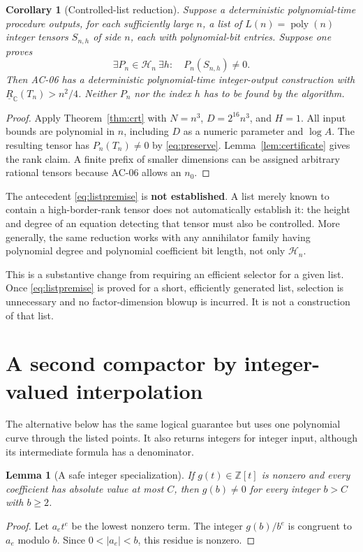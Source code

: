 \documentclass[11pt]{article}
\newtheorem{lemma}[theorem]{Lemma}
\newtheorem{corollary}[theorem]{Corollary}
\theoremstyle{definition}
\theoremstyle{remark}
\newcommand{\C}{\mathbb C}
\newcommand{\Z}{\mathbb Z}
\newcommand{\BR}{\underline R_{\C}}
\newcommand{\poly}{\operatorname{poly}}
\newcommand{\Witness}{\mathcal H}
\begin{document}
\begin{corollary}[Controlled-list reduction]\label{cor:list}
Suppose a deterministic polynomial-time procedure outputs, for each sufficiently large $n$, a list of $L(n)=\poly(n)$ integer tensors $S_{n,h}$ of side $n$, each with polynomial-bit entries. Suppose one proves
\begin{equation}\label{eq:listpremise}
 \exists P_n\in\Witness_n\ \exists h:\quad P_n(S_{n,h})\ne0.
\end{equation}
Then AC-06 has a deterministic polynomial-time integer-output construction with $\BR(T_n)>n^2/4$. Neither $P_n$ nor the index $h$ has to be found by the algorithm.
\end{corollary}
\begin{proof}
Apply Theorem~\ref{thm:crt} with $N=n^3$, $D=2^{16}n^3$, and $H=1$. All input bounds are polynomial in $n$, including $D$ as a numeric parameter and $\log A$. The resulting tensor has $P_n(T_n)\ne0$ by \eqref{eq:preserve}. Lemma~\ref{lem:certificate} gives the rank claim. A finite prefix of smaller dimensions can be assigned arbitrary rational tensors because AC-06 allows an $n_0$.
\end{proof}

The antecedent \eqref{eq:listpremise} is \textbf{not established}. A list merely known to contain a high-border-rank tensor does not automatically establish it: the height and degree of an equation detecting that tensor must also be controlled. More generally, the same reduction works with any annihilator family having polynomial degree and polynomial coefficient bit length, not only $\Witness_n$.

This is a substantive change from requiring an efficient selector for a given list. Once \eqref{eq:listpremise} is proved for a short, efficiently generated list, selection is unnecessary and no factor-dimension blowup is incurred. It is not a construction of that list.

\section{A second compactor by integer-valued interpolation}\label{sec:interpolation}

The alternative below has the same logical guarantee but uses one polynomial curve through the listed points. It also returns integers for integer input, although its intermediate formula has a denominator.

\begin{lemma}[A safe integer specialization]\label{lem:base}
If $g(t)\in\Z[t]$ is nonzero and every coefficient has absolute value at most $C$, then $g(b)\ne0$ for every integer $b>C$ with $b\ge2$.
\end{lemma}
\begin{proof}
Let $a_e t^e$ be the lowest nonzero term. The integer $g(b)/b^e$ is congruent to $a_e$ modulo $b$. Since $0<|a_e|<b$, this residue is nonzero.
\end{proof}
\end{document}
